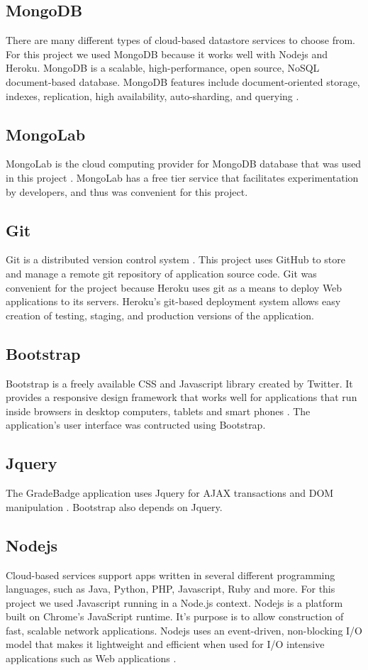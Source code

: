 \subsection{MongoDB}
There are many different types of cloud-based datastore services to choose from. For this project we used MongoDB because it works well with Nodejs and Heroku.  MongoDB is a scalable, high-performance, open source, NoSQL document-based database. MongoDB features include document-oriented storage, indexes, replication, high availability, auto-sharding, and querying \cite{mongodb}. 

\subsection{MongoLab}
MongoLab is the cloud computing provider for MongoDB database that was used in this project \cite{mongolab}.  MongoLab has a free tier service that facilitates experimentation by developers, and thus was convenient for this project. 

\subsection{Git}
Git is a distributed version control system \cite{github}.  This project uses GitHub to store and manage a remote git repository of application source code.  Git was convenient for the project because Heroku uses git as a means to deploy Web applications to its servers. Heroku's git-based deployment system allows easy creation of testing, staging, and production versions of the application.

\subsection{Bootstrap}
Bootstrap is a freely available CSS and Javascript library created by Twitter.  It provides a responsive design framework that works well for applications that run inside browsers in desktop computers, tablets and smart phones \cite{bootstrap}. The application's user interface was contructed using Bootstrap. 

\subsection{Jquery}
The GradeBadge application uses Jquery for AJAX transactions and DOM manipulation \cite{JQuery}.  Bootstrap also depends on Jquery.

\subsection{Nodejs}
Cloud-based services support apps written in several different programming languages, such as Java, Python, PHP, Javascript, Ruby and more. For this project we used Javascript running in a Node.js context. Nodejs is a platform built on Chrome's JavaScript runtime.  It's purpose is to allow construction of fast, scalable network applications. Nodejs uses an event-driven, non-blocking I/O model that makes it lightweight and efficient when used for I/O intensive applications such as Web applications \cite{nodejs}.

